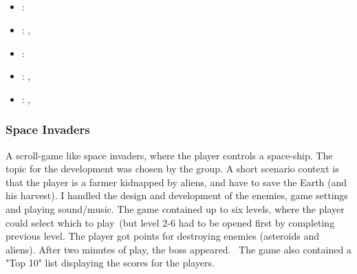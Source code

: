 \subsection[Flash Programming]{}
\label{sec:flash_prog}
\begin{itemize} 
\item {}: 
\item {}: , 
\item {}: 
\item {}: , 
\item {}: , 
\end{itemize} 

\subsubsection{Space Invaders}
\label{sec:space_invaders}
A scroll-game like space invaders, where the player controls a space-ship. 
The topic for the development was chosen by the group. 
A short scenario context is that the player is a farmer kidnapped by aliens, and have to save the Earth (and his harvest).
\vspace{0.5em}\newline
I handled the design and development of the enemies, game settings and playing sound/music. 
The game contained up to six levels, where the player could select which to play (but level 2-6 had to be opened first by completing previous level. 
The player got points for destroying enemies (asteroids and aliens). 
After two minutes of play, the boss appeared. 
The game also contained a "Top 10" list displaying the scores for the players.

